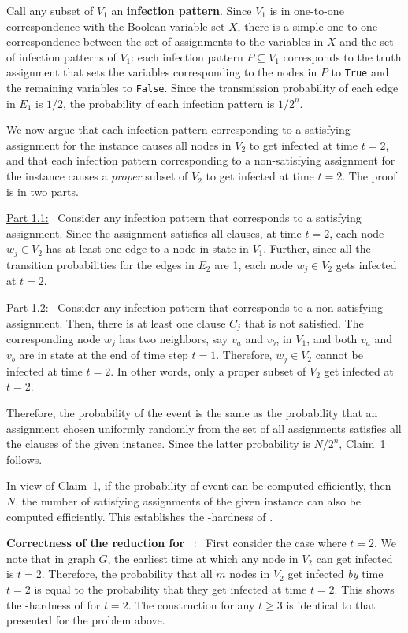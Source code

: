 Call any subset of $V_1$ an \textbf{infection pattern}.
Since $V_1$ is in one-to-one correspondence with the 
Boolean variable set $X$, there is a
simple one-to-one correspondence between
the set of assignments to the variables in $X$
and the set of infection patterns of $V_1$: 
each infection pattern $P \subseteq V_1$ corresponds to the truth
assignment that sets the variables corresponding to the nodes in $P$
to \texttt{True} and the remaining variables to \texttt{False}. 
Since the transmission probability of each edge in $E_1$ is $1/2$,
the probability of each infection pattern is $1/2^n$. 

We now argue that each infection pattern corresponding to a satisfying
assignment for the \mtsat{} instance causes all nodes in $V_2$
to get infected at time $t = 2$, and that
each infection pattern corresponding to a non-satisfying
assignment for the \mtsat{} instance causes a \emph{proper} subset of 
$V_2$ to get infected at time $t = 2$.
The proof is in two parts.

\noindent
\underline{Part 1.1:}~
Consider any infection pattern that corresponds to a
satisfying assignment.
Since the assignment satisfies all clauses, at time $t = 2$,
each node $w_j \in V_2$ has at least one edge to a node 
in state \istate{} in $V_1$.
Further, since all the transition probabilities for the edges in $E_2$ are 1,
each node $w_j \in V_2$ gets infected at $t = 2$. 

\noindent
\underline{Part 1.2:}~
Consider any infection pattern that corresponds to a
non-satisfying assignment.
Then, there is at least one clause $C_j$ that is not satisfied.
The corresponding node $w_j$ has two neighbors, say $v_a$ and $v_b$,
in $V_1$, and both $v_a$ and $v_b$ are in state \sstate{} at the 
end of time step $t = 1$.
Therefore, $w_j \in V_2$ cannot be infected at time $t = 2$.
In other words, only a proper subset of $V_2$ get infected at $t = 2$.

Therefore, the probability of the event \cale{} is the same as
the probability that an assignment chosen uniformly randomly from
the set of all assignments satisfies all the clauses of the given
\mtsat{} instance.
Since the latter probability is $N/2^n$, Claim~1 follows. 

In view of Claim~1, if the probability of event \cale{} can be computed 
efficiently, then $N$, the number of satisfying assignments
of the given \mtsat{} instance can also be computed efficiently. 
This establishes the \cnump-hardness of \TwoNewInfs.


\medskip
\noindent
\textbf{Correctness of the reduction for}~ \TwoTotInfs:~
First consider the case where $t = 2$.
We note that in graph $G$, the earliest time at which any node in 
$V_2$ can get infected is $t = 2$.
Therefore, the probability that all $m$ nodes in $V_2$ get infected
\emph{by} time $t = 2$ is equal to the probability that they get infected
at time $t = 2$.
This shows the \cnump-hardness of \tTotInfs{} for $t = 2$.
The construction for any $t \geq 3$ is identical to that presented for
the \tNewInfs{} problem above.

